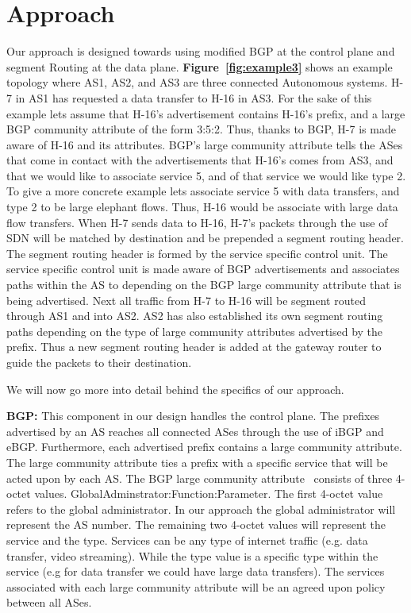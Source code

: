 

\section{Approach}
\label{sec:approach}

Our approach is designed towards using modified BGP at the control plane and segment Routing
at the data plane.  \textbf{Figure~\ref{fig:example3}} shows an example topology where AS1, AS2, 
and AS3 are three connected Autonomous systems. H-7 in AS1 has requested a data transfer to
H-16 in AS3. For the sake of this example lets assume that H-16's advertisement contains H-16's 
prefix, and a large BGP community attribute of the form 3:5:2. Thus, thanks to BGP, H-7 is made 
aware of H-16 and its attributes. BGP's large community attribute tells the ASes that come in 
contact with the advertisements that H-16's comes from AS3, and that we would like to associate
service 5, and of that service we would like type 2. To give a more concrete example lets associate 
service 5 with data transfers, and type 2 to be large elephant flows. Thus, H-16 would be associate
with large data flow transfers. When H-7 sends data to H-16, H-7's packets through the use of SDN
will be matched by destination and be prepended a segment routing header. The segment routing
header is formed by the service specific control unit. The service specific control unit is made aware
of BGP advertisements and associates paths within the AS to depending on the BGP large community
attribute that is being advertised. Next all traffic from H-7 to H-16 will be segment routed through AS1
and into AS2. AS2 has also established its own segment routing paths depending on the type of large
community attributes advertised by the prefix. Thus a new segment routing header is added at the 
gateway router to guide the packets to their destination. 

We will now go more into detail behind the specifics of our approach.

\textbf{BGP:} This component in our design handles the control plane. The prefixes advertised by an AS
reaches all connected ASes through the use of iBGP and eBGP. Furthermore, each advertised prefix
contains a large community attribute. The large community attribute ties a prefix with a specific service
that will be acted upon by each AS. The BGP large community attribute~\cite{largeBGP} consists of
three 4-octet values. GlobalAdminstrator:Function:Parameter. The first 4-octet value refers to the global
administrator. In our approach the global administrator will represent the AS number. The remaining 
two 4-octet values will represent the service and the type. Services can be any type of internet traffic
(e.g. data transfer, video streaming). While the type value is a specific type within the service (e.g 
for data transfer we could have large data transfers). The services associated with each large community
attribute will be an agreed upon policy between all ASes. 

